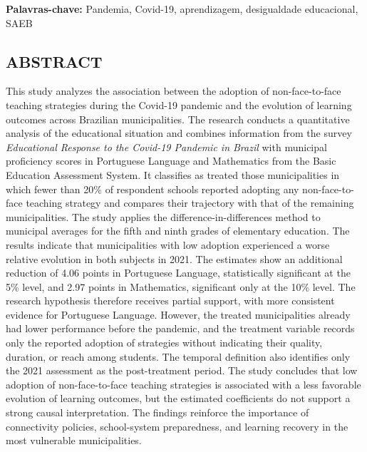 \documentclass[
	12pt,				%
	openright,			%
	oneside,			%
	a4paper,			%
	brazil,				%
	]{article}
\renewcommand{\baselinestretch}{1.3}
\begin{document}
\noindent\textbf{Palavras-chave:} Pandemia, Covid-19, aprendizagem, desigualdade educacional, SAEB
\endgroup

\newpage
\thispagestyle{empty}
\begin{center}
\section*{ABSTRACT}
\end{center}

\begingroup
\renewcommand{\baselinestretch}{1.0}\selectfont
\noindent This study analyzes the association between the adoption of
non-face-to-face teaching strategies during the Covid-19 pandemic and the
evolution of learning outcomes across Brazilian municipalities. The research
conducts a quantitative analysis of the educational situation and combines
information from the survey \textit{Educational Response to the Covid-19
Pandemic in Brazil} with municipal proficiency scores in Portuguese Language
and Mathematics from the Basic Education Assessment System. It classifies as
treated those municipalities in which fewer than 20\% of respondent schools
reported adopting any non-face-to-face teaching strategy and compares their
trajectory with that of the remaining municipalities. The study applies the
difference-in-differences method to municipal averages for the fifth and ninth
grades of elementary education. The results indicate that municipalities with
low adoption experienced a worse relative evolution in both subjects in 2021.
The estimates show an additional reduction of 4.06 points in Portuguese
Language, statistically significant at the 5\% level, and 2.97 points in
Mathematics, significant only at the 10\% level. The research hypothesis
therefore receives partial support, with more consistent evidence for
Portuguese Language. However, the treated municipalities already had lower
performance before the pandemic, and the treatment variable records only the
reported adoption of strategies without indicating their quality, duration, or
reach among students. The temporal definition also identifies only the 2021
assessment as the post-treatment period. The study concludes that low adoption
of non-face-to-face teaching strategies is associated with a less favorable
evolution of learning outcomes, but the estimated coefficients do not support a
strong causal interpretation. The findings reinforce the importance of
connectivity policies, school-system preparedness, and learning recovery in the
most vulnerable municipalities.
\end{document}
